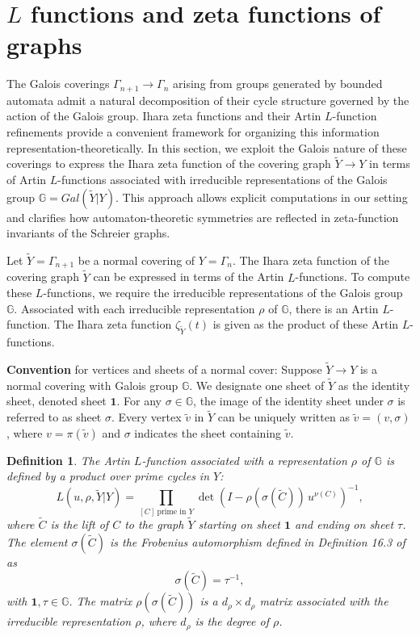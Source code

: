 \documentclass{article}
\newtheorem{mydef}{Definition}[section]
\newcommand{\G}{\Gamma}
\newcommand{\gid}{\mathbf{1}}
\newcommand{\Gal}{\mathbb{G}}
\newcommand{\Y}{\widetilde{Y}}
\begin{document}
\section{$L$ functions and zeta functions of graphs}\label{sec:zeta}

The Galois coverings $\G_{n+1} \to \G_n$ arising from groups generated by bounded automata admit a natural decomposition of their cycle structure governed by the action of the Galois group. Ihara zeta functions and their Artin $L$-function refinements provide a convenient framework for organizing this information representation-theoretically. In this section, we exploit the Galois nature of these coverings to express the Ihara zeta function of the covering graph $\Y \to Y$ in terms of Artin $L$-functions associated with irreducible representations of the Galois group $\Gal=Gal(\Y|Y)$. This approach allows explicit computations in our setting and clarifies how automaton-theoretic symmetries are reflected in zeta-function invariants of the Schreier graphs.

Let $\Y = \G_{n+1}$ be a normal covering of $Y = \G_n$. The Ihara zeta function of the covering graph $\Y$ can be expressed in terms of the Artin $L$-functions. To compute these $L$-functions, we require the irreducible representations of the Galois group $\Gal$. Associated with each irreducible representation $\rho$ of $\Gal$, there is an Artin $L$-function. The Ihara zeta function $\zeta_{\Y}(t)$ is given as the product of these Artin $L$-functions.

\medskip
\noindent
\textbf{Convention} for vertices and sheets of a normal cover: Suppose $\Y \to Y$ is a normal covering with Galois group $\Gal$. We designate one sheet of $\Y$ as the identity sheet, denoted sheet $\gid$. For any $\sigma \in \Gal$, the image of the identity sheet under $\sigma$ is referred to as sheet $\sigma$. Every vertex $\tilde{v}$ in $\Y$ can be uniquely written as $\tilde{v} = (v, \sigma)$, where $v = \pi(\tilde{v})$ and $\sigma$ indicates the sheet containing $\tilde{v}$.

\medskip
\begin{mydef} The Artin $L$-function associated with a representation $\rho$ of $\Gal$ is defined by a product over prime cycles in $Y$:
$$
L(u,\rho,\Y|Y) = \prod_{[C]~\text{prime in } Y} \det(I - \rho(\sigma(\widetilde{C})) \, u^{\nu(C)})^{-1},
$$
where $\widetilde{C}$ is the lift of $C$ to the graph $\Y$ starting on sheet $\gid$ and ending on sheet $\tau$. The element $\sigma(\widetilde{C})$ is the Frobenius automorphism defined in Definition 16.3 of \cite{terras2010zeta} as
$$
\sigma(\widetilde{C}) = \tau^{-1},
$$
with $\gid, \tau \in \Gal$. The matrix $\rho(\sigma(\widetilde{C}))$ is a $d_{\rho} \times d_{\rho}$ matrix associated with the irreducible representation $\rho$, where $d_{\rho}$ is the degree of $\rho$.\end{mydef}
\end{document}
